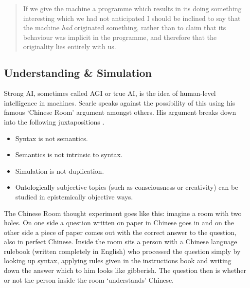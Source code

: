 \begin{quotation}
  If we give the machine a programme which results in its doing something interesting which we had not anticipated I should be inclined to say that the machine \textit{had} originated something, rather than to claim that its behaviour was implicit in the programme, and therefore that the originality lies entirely with us.  
\end{quotation}



\subsection{Understanding \& Simulation}
\label{s:undersimu}




Strong \ac{AI}, sometimes called \ac{AGI} or true \ac{AI}, is the idea of human-level intelligence in machines. Searle speaks against the possibility of this using his famous `Chinese Room' argument amongst others. His argument breaks down into the following juxtapositions \autocite*{Searle1990,Searle2015}.

\begin{itemize}
  \item Syntax is not semantics.
  \item Semantics is not intrinsic to syntax.
  \item Simulation is not duplication.
  \item Ontologically subjective topics (such as consciousness or creativity) can be studied in epistemically objective ways.
\end{itemize}

The Chinese Room thought experiment goes like this: imagine a room with two holes. On one side a question written on paper in Chinese goes in and on the other side a piece of paper comes out with the correct answer to the question, also in perfect Chinese. Inside the room sits a person with a Chinese language rulebook (written completely in English) who processed the question simply by looking up syntax, applying rules given in the instructions book and writing down the answer which to him looks like gibberish. The question then is whether or not the person inside the room `understands' Chinese.

